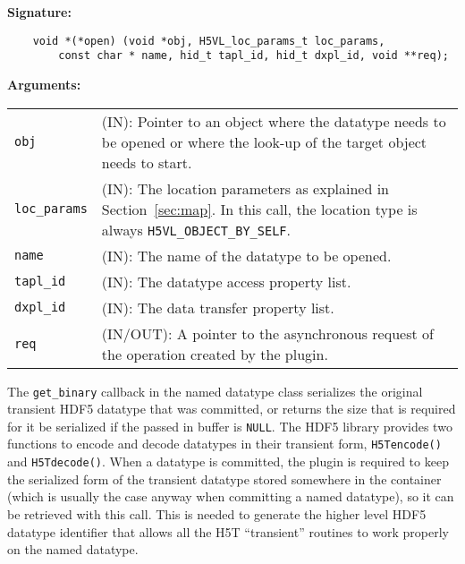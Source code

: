 \begin{mdframed}[style=bgbox]
\textbf{Signature:}
\begin{lstlisting}
    void *(*open) (void *obj, H5VL_loc_params_t loc_params, 
        const char * name, hid_t tapl_id, hid_t dxpl_id, void **req);
\end{lstlisting}

\textbf{Arguments:}\\
\begin{tabular}{l p{13.5cm}}
  \texttt{obj} & (IN): Pointer to an object where the datatype needs
  to be opened or where the look-up of the target object needs to
  start.\\
  \texttt{loc\_params} & (IN): The location parameters as explained in
  Section~\ref{sec:map}. In this call, the location type is always \texttt{H5VL\_OBJECT\_BY\_SELF}. \\
  \texttt{name} & (IN): The name of the datatype to be opened.\\
  \texttt{tapl\_id} & (IN): The datatype access property list.\\
  \texttt{dxpl\_id} & (IN): The data transfer property list.\\
  \texttt{req} & (IN/OUT): A pointer to the asynchronous request of the
  operation created by the plugin.\\
\end{tabular}
\end{mdframed}

The \texttt{get\_binary} callback in the named datatype class
serializes the original transient HDF5 datatype that was committed, or
returns the size that is required for it be serialized if the passed in
buffer is \texttt{NULL}. The HDF5 library provides two functions to
encode and decode datatypes in their transient form, \texttt{H5Tencode()}
and \texttt{H5Tdecode()}. When a datatype is committed, the plugin is
required to keep the serialized form of the transient datatype stored
somewhere in the container (which is usually the case anyway when
committing a named datatype), so it can be retrieved with this
call. This is needed to generate the higher level HDF5 datatype
identifier that allows all the H5T ``transient'' routines to work
properly on the named datatype.\bigskip

